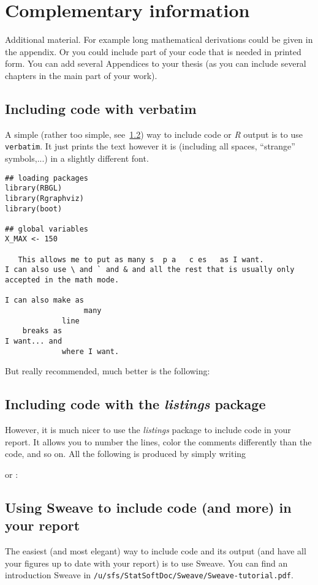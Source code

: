 \chapter{Complementary information}
\label{app:complement}

Additional material. For example long mathematical derivations could be
given in the appendix. Or you could include part of your code that is
needed in printed form. You can add several Appendices to your thesis (as
you can include several chapters in the main part of your work).

\section{Including \Rp code with verbatim}
A simple (rather too simple, see~\ref{App:listings}) way to include code or
{\it R} output is to use 
\texttt{verbatim}. It just prints the text however it is (including all
spaces, ``strange'' symbols,...) in a slightly different font.
\begin{verbatim}
## loading packages
library(RBGL)
library(Rgraphviz)
library(boot)

## global variables
X_MAX <- 150

   This allows me to put as many s  p a   c es   as I want.
I can also use \ and ` and & and all the rest that is usually only 
accepted in the math mode.

I can also make as 
                  many 
             line 
    breaks as 
I want... and
             where I want. 
\end{verbatim}

But really recommended,  much better is the following:

\section{Including \Rp code with the \emph{listings} package}\label{App:listings}
However, it is much nicer to use the \emph{listings} package to include \Rp
code in your report. It allows you to number the lines, color the comments
differently than the code, and so on.
All the following is produced by simply writing

or \verb!! :


\section{Using Sweave to include \Rp code (and more) in your report}
The easiest (and most elegant) way to include \Rp code and its output (and
have all your figures up to date with your report) is to use Sweave. You
can find an introduction Sweave in \texttt{/u/sfs/StatSoftDoc/Sweave/Sweave-tutorial.pdf}.

